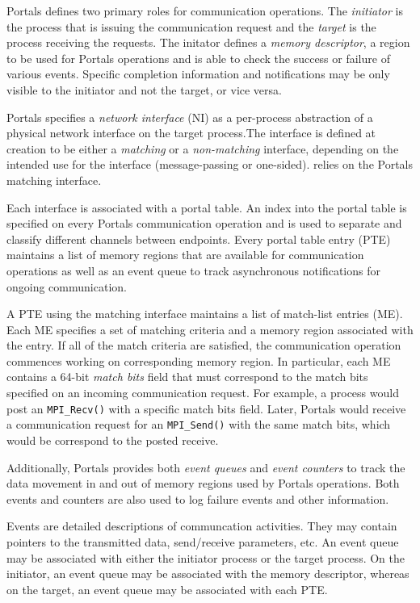 Portals defines two primary roles for communication operations. The
{\em initiator} is the process that is issuing the communication
request and the {\em target} is the process receiving the
requests. The initator defines a {\em memory descriptor}, a
region to be used for Portals operations and is able to check the
success or failure of various events. Specific completion information
and notifications may be only visible to the initiator and not the
target, or vice versa.

Portals specifies a {\em network interface} (NI) as a per-process
abstraction of a physical network interface on the target process.The
interface is defined at creation to be either a {\em matching}
or a {\em non-matching} interface, depending on the intended use for
the interface (message-passing or one-sided). \pdht relies on the
Portals matching interface.

Each interface is associated with a portal table. An index into the
portal table is specified on every Portals communication operation and
is used to separate and classify different channels between endpoints.
Every portal table entry (PTE) maintains a list of memory regions that
are available for communication operations as well as an event queue
to track asynchronous notifications for ongoing communication.

A PTE using the matching interface maintains a list of match-list
entries (ME). Each ME specifies a set of matching criteria and a
memory region associated with the entry. If all of the match criteria
are satisfied, the communication operation commences working on
corresponding memory region. In particular, each ME contains a 64-bit
{\em match bits} field that must correspond to the match bits
specified on an incoming communication request. For example, a process
would post an {\tt MPI\_Recv()} with a specific match bits
field. Later, Portals would receive a communication request for an
{\tt MPI\_Send()} with the same match bits, which would be correspond
to the posted receive.

Additionally, Portals provides both {\em event queues} and {\em event
  counters} to track the data movement in and out of memory regions
used by Portals operations. Both events and counters are also used to
log failure events and other information. 

Events are detailed descriptions of communcation activities. They may
contain pointers to the transmitted data, send/receive parameters,
etc. An event queue may be associated with either the initiator
process or the target process.  On the initiator, an event queue may
be associated with the memory descriptor, whereas on the target,
an event queue may be associated with each PTE. 

